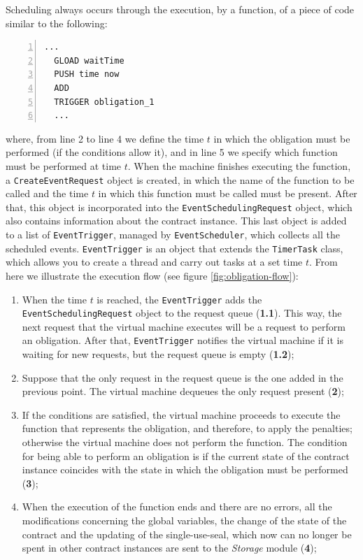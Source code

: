 Scheduling always occurs through the execution, by a function, of a piece of code similar to the 
following:

\begin{Verbatim}[numbers=left,xleftmargin=1cm,firstnumber=1,tabsize=2]
  ...
  GLOAD waitTime
  PUSH time now
  ADD
  TRIGGER obligation_1
  ...
\end{Verbatim}

where, from line 2 to line 4 we define the time $t$ in which the obligation must be performed (if the 
conditions allow it), and in line 5 we specify which function must be performed at time $t $. When the 
machine finishes executing the function, a \verb|CreateEventRequest| object is created, in which the name 
of the function to be called and the time $t$ in which this function must be called must be present. After 
that, this object is incorporated into the \verb|EventSchedulingRequest| object, which also contains 
information about the contract instance. This last object is added to a list of \verb|EventTrigger|, 
managed by \verb|EventScheduler|, which collects all the scheduled events. \verb|EventTrigger| is an 
object that extends the \verb|TimerTask| class, which allows you to create a thread and carry out tasks 
at a set time $t$. From here we illustrate the execution flow (see figure \ref{fig:obligation-flow}):
\begin{enumerate}
  \item When the time $t$ is reached, the \verb|EventTrigger| adds the \verb|EventSchedulingRequest| 
  object to the request queue (\textbf{1.1}). This way, the next request that the virtual machine 
  executes will be a request to perform an obligation. After that, \verb|EventTrigger| notifies the 
  virtual machine if it is waiting for new requests, but the request queue is empty (\textbf{1.2});
  \item Suppose that the only request in the request queue is the one added in the previous point. The 
  virtual machine dequeues the only request present (\textbf{2});
  \item If the conditions are satisfied, the virtual machine proceeds to execute the function that 
  represents the obligation, and therefore, to apply the penalties; otherwise the virtual machine does 
  not perform the function. The condition for being able to perform an obligation is if the current state 
  of the contract instance coincides with the state in which the obligation must be performed (\textbf{3});
  \item When the execution of the function ends and there are no errors, all the modifications concerning 
  the global variables, the change of the state of the contract and the updating of the single-use-seal, 
  which now can no longer be spent in other contract instances are sent to the \textit{Storage} module 
  (\textbf{4});
\end{enumerate}

